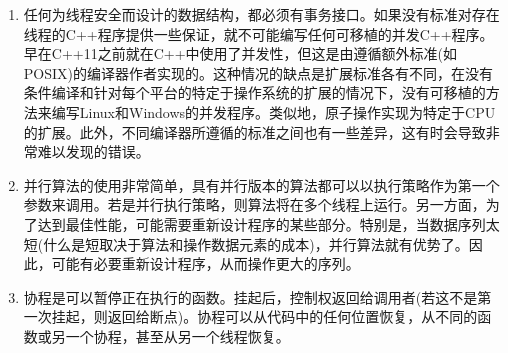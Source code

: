 \begin{enumerate}
\item 
任何为线程安全而设计的数据结构，都必须有事务接口。如果没有标准对存在线程的C++程序提供一些保证，就不可能编写任何可移植的并发C++程序。早在C++11之前就在C++中使用了并发性，但这是由遵循额外标准(如POSIX)的编译器作者实现的。这种情况的缺点是扩展标准各有不同，在没有条件编译和针对每个平台的特定于操作系统的扩展的情况下，没有可移植的方法来编写Linux和Windows的并发程序。类似地，原子操作实现为特定于CPU的扩展。此外，不同编译器所遵循的标准之间也有一些差异，这有时会导致非常难以发现的错误。

\item 
并行算法的使用非常简单，具有并行版本的算法都可以以执行策略作为第一个参数来调用。若是并行执行策略，则算法将在多个线程上运行。另一方面，为了达到最佳性能，可能需要重新设计程序的某些部分。特别是，当数据序列太短(什么是短取决于算法和操作数据元素的成本)，并行算法就有优势了。因此，可能有必要重新设计程序，从而操作更大的序列。

\item 
协程是可以暂停正在执行的函数。挂起后，控制权返回给调用者(若这不是第一次挂起，则返回给断点)。协程可以从代码中的任何位置恢复，从不同的函数或另一个协程，甚至从另一个线程恢复。

\end{enumerate}